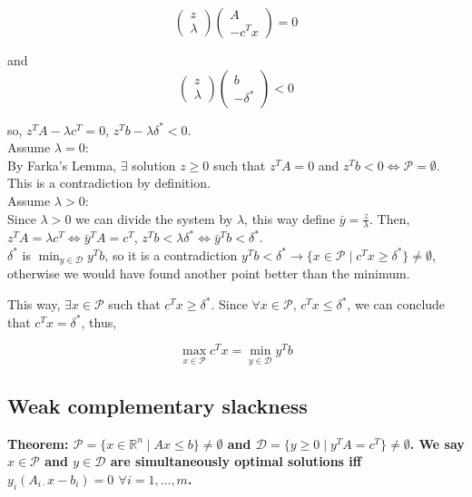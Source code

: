 \documentclass[main]{subfiles}
\begin{document}
\begin{equation}
\begin{pmatrix}
    z \\
    \lambda
\end{pmatrix}
\begin{pmatrix}
    A \\
    -c^T x
\end{pmatrix}
= 0
\end{equation}

and
\begin{equation}
\begin{pmatrix}
    z \\
    \lambda
\end{pmatrix}
\begin{pmatrix}
    b \\
    -\delta^*
\end{pmatrix}
< 0
\end{equation}

so, $z^T A - \lambda c^T = 0$, $z^T b -\lambda \delta^* < 0$.\\
Assume $\lambda = 0$:\\
By Farka's Lemma, $\exists$ solution $z \geq 0$ such that $z^T A = 0$ and
$z^T b < 0 \iff \mathcal{P} = \emptyset$.
This is a contradiction by definition.\\
Assume $\lambda > 0$:\\
Since $\lambda > 0$ we can divide the system by $\lambda$, this way define
$\bar{y} = \frac{z}{\lambda}$. Then, $z^T A = \lambda c^T \iff
\bar{y}^T A = c^T$, $z^T b < \lambda \delta^* \iff \bar{y}^T b < \delta^*$.\\
$\delta^*$ is $\displaystyle \min_{y \in \mathcal{D}} y^{T}b$, so it is a
contradiction $y^T b < \delta^* \rightarrow \{ x \in \mathcal{P} \mid c^T x 
\geq \delta^*\} \neq \emptyset$, otherwise we would have found another
point better than the minimum.

This way, $\exists x \in \mathcal{P}$ such that $c^Tx \geq \delta^*$.
Since $\forall x \in \mathcal{P}$, $c^Tx \leq \delta^*$, we can conclude that
$c^T x = \delta^*$, thus,

\begin{equation}
\displaystyle \max_{x \in \mathcal{P}} c^{T}x = \displaystyle \min_{y \in 
\mathcal{D}} y^{T}b
\end{equation}

\subsection{Weak complementary slackness}
\textbf{Theorem: $\mathcal{P} = \{x \in \mathbb{R}^n \mid Ax \leq b \} \neq
\emptyset$ and $\mathcal{D} = \{ y \geq 0 \mid y^T A = c^T \} \neq \emptyset$.
We say $x \in \mathcal{P}$ and $y \in \mathcal{D}$ are simultaneously optimal
solutions iff $y_i (A_{i\cdot}x - b_i) = 0$ $\forall i = 1, \dots, m$. }
\end{document}
